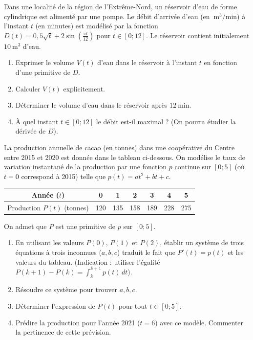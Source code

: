 \documentclass[11pt]{article}
\begin{document}
\begin{exercice}
Dans une localité de la région de l'Extrême-Nord, un réservoir d'eau de forme cylindrique est alimenté par une pompe. Le débit d'arrivée d'eau (en $\SI{}{\meter^3\per\minute}$) à l'instant $t$ (en minutes) est modélisé par la fonction $D(t) = 0,5\sqrt{t} + 2\sin\left(\frac{\pi t}{12}\right)$ pour $t \in [0; 12]$.
Le réservoir contient initialement $\SI{10}{\meter^3}$ d'eau.
\begin{enumerate}
    \item Exprimer le volume $V(t)$ d'eau dans le réservoir à l'instant $t$ en fonction d'une primitive de $D$.
    \item Calculer $V(t)$ explicitement.
    \item Déterminer le volume d'eau dans le réservoir après $\SI{12}{\minute}$.
    \item À quel instant $t \in [0; 12]$ le débit est-il maximal ? (On pourra étudier la dérivée de $D$).
\end{enumerate}
\end{exercice}

\begin{exercice}
La production annuelle de cacao (en tonnes) dans une coopérative du Centre entre 2015 et 2020 est donnée dans le tableau ci-dessous. On modélise le taux de variation instantané de la production par une fonction $p$ continue sur $[0;5]$ (où $t=0$ correspond à 2015) telle que $p(t) = at^2 + bt + c$.

\begin{center}
\begin{tabular}{|c|c|c|c|c|c|c|}
\hline
Année ($t$) & 0 & 1 & 2 & 3 & 4 & 5 \\
\hline
Production $P(t)$ (tonnes) & 120 & 135 & 158 & 189 & 228 & 275 \\
\hline
\end{tabular}
\end{center}

On admet que $P$ est une primitive de $p$ sur $[0;5]$.
\begin{enumerate}
    \item En utilisant les valeurs $P(0)$, $P(1)$ et $P(2)$, établir un système de trois équations à trois inconnues ($a, b, c$) traduit le fait que $P'(t) = p(t)$ et les valeurs du tableau. (Indication : utiliser l'égalité $P(k+1) - P(k) = \int_k^{k+1} p(t)\,dt$).
    \item Résoudre ce système pour trouver $a, b, c$.
    \item Déterminer l'expression de $P(t)$ pour tout $t \in [0;5]$.
    \item Prédire la production pour l'année 2021 ($t=6$) avec ce modèle. Commenter la pertinence de cette prévision.
\end{enumerate}
\end{exercice}
\end{document}
